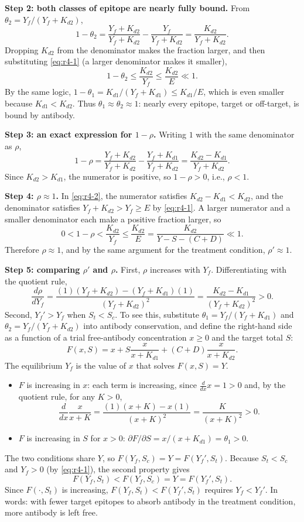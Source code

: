 \textbf{Step 2: both classes of epitope are nearly fully bound.} From
$\theta_2=Y_f/(Y_f+K_{d2})$,
$$
1-\theta_2
=\frac{Y_f+K_{d2}}{Y_f+K_{d2}}-\frac{Y_f}{Y_f+K_{d2}}
=\frac{K_{d2}}{Y_f+K_{d2}}.
$$
Dropping $K_{d2}$ from the denominator makes the fraction larger, and
then substituting \eqref{eq:r4-1} (a larger denominator makes it smaller),
$$
1-\theta_2
\le\frac{K_{d2}}{Y_f}
\le\frac{K_{d2}}{E}
\ll1.
$$
By the same logic, $1-\theta_1=K_{d1}/(Y_f+K_{d1})\le K_{d1}/E$, which is
even smaller because $K_{d1}<K_{d2}$. Thus $\theta_1\approx\theta_2\approx1$:
nearly every epitope, target or off-target, is bound by antibody.

\textbf{Step 3: an exact expression for $1-\rho$.} Writing $1$ with the
same denominator as $\rho$,
\begin{equation}
1-\rho
=\frac{Y_f+K_{d2}}{Y_f+K_{d2}}-\frac{Y_f+K_{d1}}{Y_f+K_{d2}}
=\frac{K_{d2}-K_{d1}}{Y_f+K_{d2}}.
\label{eq:r4-2}
\end{equation}
Since $K_{d2}>K_{d1}$, the numerator is positive, so $1-\rho>0$, i.e.,
$\rho<1$.

\textbf{Step 4: $\rho\approx1$.} In \eqref{eq:r4-2}, the numerator
satisfies $K_{d2}-K_{d1}<K_{d2}$, and the denominator satisfies
$Y_f+K_{d2}>Y_f\ge E$ by \eqref{eq:r4-1}. A larger numerator and a
smaller denominator each make a positive fraction larger, so
\begin{equation}
0<1-\rho<\frac{K_{d2}}{Y_f}\le\frac{K_{d2}}{E}=\frac{K_{d2}}{Y-S-(C+D)}\ll1.
\label{eq:r4-3}
\end{equation}
Therefore $\rho\approx1$, and by the same argument for the treatment
condition, $\rho'\approx1$.

\textbf{Step 5: comparing $\rho'$ and $\rho$.} First, $\rho$ increases
with $Y_f$. Differentiating with the quotient rule,
$$
\frac{d\rho}{dY_f}
=\frac{(1)(Y_f+K_{d2})-(Y_f+K_{d1})(1)}{(Y_f+K_{d2})^2}
=\frac{K_{d2}-K_{d1}}{(Y_f+K_{d2})^2}
>0.
$$
Second, $Y_f'>Y_f$ when $S_t<S_c$. To see this, substitute
$\theta_1=Y_f/(Y_f+K_{d1})$ and $\theta_2=Y_f/(Y_f+K_{d2})$ into antibody
conservation, and define the right-hand side as a function of a trial
free-antibody concentration $x\ge 0$ and the target total $S$:
$$
F(x,S)=x+S\frac{x}{x+K_{d1}}+(C+D)\frac{x}{x+K_{d2}}.
$$
The equilibrium $Y_f$ is the value of $x$ that solves $F(x,S)=Y$.
\begin{itemize}
    \item $F$ is increasing in $x$: each term is increasing, since
    $\frac{d}{dx}x=1>0$ and, by the quotient rule, for any $K>0$,
    $$
    \frac{d}{dx}\frac{x}{x+K}
    =\frac{(1)(x+K)-x(1)}{(x+K)^2}
    =\frac{K}{(x+K)^2}>0.
    $$
    \item $F$ is increasing in $S$ for $x>0$: $\partial F/\partial S
    =x/(x+K_{d1})=\theta_1>0$.
\end{itemize}
The two conditions share $Y$, so $F(Y_f,S_c)=Y=F(Y_f',S_t)$. Because
$S_t<S_c$ and $Y_f>0$ (by \eqref{eq:r4-1}), the second property gives
$$
F(Y_f,S_t)<F(Y_f,S_c)=Y=F(Y_f',S_t).
$$
Since $F(\cdot,S_t)$ is increasing, $F(Y_f,S_t)<F(Y_f',S_t)$ requires
$Y_f<Y_f'$. In words: with fewer target epitopes to absorb antibody in
the treatment condition, more antibody is left free.

